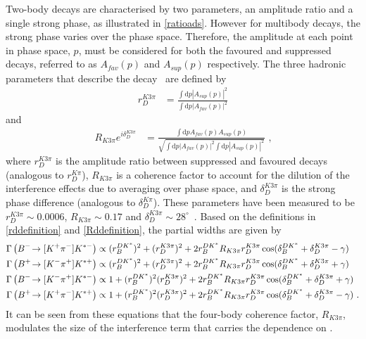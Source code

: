 Two-body \decay{\D}{\Kmp\pipm} decays are characterised by two parameters, an amplitude ratio and a single strong phase, as illustrated in \eqn\ref{ratioads}. However for multibody \decay{\D}{\Kmp\pipm\pimp\pipm} decays, the strong phase varies over the phase space. Therefore, the amplitude at each point in phase space, $p$, must be considered for both the \decay{\Dz}{\Km\pip\pim\pip} favoured and \decay{\Dz}{\Kp\pim\pip\pim} suppressed decays, referred to as $A_{fav}(p)$ and $A_{sup}(p)$ respectively. The three hadronic parameters that describe the \decay{\D}{\Km\pip\pim\pip} decay~\cite{charmk3pi,charmk3pi_errata,LHCb-PAPER-2015-057} are defined by
\begin{align}
r_D^{K3\pi} &= \frac{\int \mathrm{d}p \left|A_{sup}(p)\right|^2}{\int \mathrm{d}p \left|A_{fav}(p)\right|^2}
\label{rddefinition}
\end{align}
and
\begin{align}
R_{K3\pi} e^{i\delta_D^{K3\pi}} &= \frac{\int \mathrm{d}p A_{fav}(p)A_{sup}(p)}{\sqrt{\int \mathrm{d}p \left|A_{fav}(p)\right|^2 \int \mathrm{d}p \left|A_{sup}(p)\right|^2}} \text { ,}
\label{Rddefinition}
\end{align}
where $r_D^{K3\pi}$ is the amplitude ratio between suppressed and favoured \decay{\D}{\Km\pip\pim\pip} decays (analogous to $r_D^{K\pi}$), $R_{K3\pi}$ is a coherence factor to account for the dilution of the interference effects due to averaging over phase space, and $\delta_D^{K3\pi}$ is the strong phase difference (analogous to $\delta_D^{K\pi}$). These parameters have been measured to be $r_D^{K3\pi} \sim 0.0006$, $R_{K3\pi} \sim 0.17$ and $\delta_D^{K3\pi} \sim 28^{\circ}$~\cite{charmk3pi,charmk3pi_errata,LHCb-PAPER-2015-057}. Based on the definitions in \eqns\ref{rddefinition} and \ref{Rddefinition}, the partial widths are given by
\begin{align}
\Gamma\left({{{B}^-}}\!\rightarrow [{{K}^+}{{\pi}^-}]{\ensuremath{{K}^{*-}}}\right) &\propto (r_B^{DK^*})^2 + (r_D^{K3\pi})^2 + 2r_B^{DK^*}R_{K3\pi}r_D^{K3\pi}\cos(\delta_B^{DK^*} + \delta_D^{K3\pi} - \gamma) \label{adsBdecaym4body} \\
\Gamma\left({{{B}^+}}\!\rightarrow [{{K}^-}{{\pi}^+}]{\ensuremath{{K}^{*+}}}\right) &\propto (r_B^{DK^*})^2 + (r_D^{K3\pi})^2 + 2r_B^{DK^*}R_{K3\pi}r_D^{K3\pi}\cos(\delta_B^{DK^*} + \delta_D^{K3\pi} + \gamma) \label{adsBdecayp4body} \\
\Gamma\left({{{B}^-}}\!\rightarrow [{{K}^-}{{\pi}^+}]{\ensuremath{{K}^{*-}}}\right) &\propto 1 + (r_B^{DK^*})^2(r_D^{K3\pi})^2 + 2r_B^{DK^*}R_{K3\pi}r_D^{K3\pi}\cos(\delta_B^{DK^*} + \delta_D^{K3\pi} + \gamma) \label{favBdecaym4body} \\
\Gamma\left({{{B}^+}}\!\rightarrow [{{K}^+}{{\pi}^-}]{\ensuremath{{K}^{*+}}}\right) &\propto 1 + (r_B^{DK^*})^2(r_D^{K3\pi})^2 + 2r_B^{DK^*}R_{K3\pi}r_D^{K3\pi}\cos(\delta_B^{DK^*} + \delta_D^{K3\pi} - \gamma) \text{ .}\label{favBdecayp4body} 
\end{align}
It can be seen from these equations that the four-body coherence factor, $R_{K3\pi}$, modulates the size of the interference term that carries the dependence on \Pgamma.


